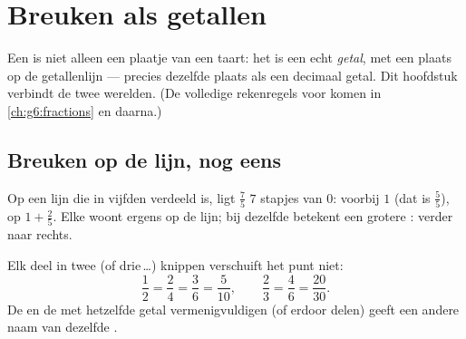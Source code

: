 \chapter{Breuken als getallen}\label{ch:g5:fractions}

Een  is niet alleen een plaatje van een taart: het is een echt
\emph{getal}, met een plaats op de getallenlijn ---  precies dezelfde
plaats als een decimaal getal. Dit hoofdstuk verbindt de twee werelden. (De
volledige rekenregels voor  komen in \cref{ch:g6:fractions} en
daarna.)

\section{Breuken op de lijn, nog eens}

\begin{example}\label{ex:g5:fractions:place}
Op een lijn die in vijfden verdeeld is, ligt $\frac{7}{5}$ $7$ stapjes van
$0$: voorbij $1$ (dat is $\frac55$), op $1 + \frac25$. Elke  woont
ergens op de lijn; bij dezelfde  betekent een grotere : verder
naar rechts.
\end{example}

\begin{proposition}\label{prop:g5:fractions:equal}
Elk deel in twee (of drie\,\dots) knippen verschuift het punt niet:
\[
\frac{1}{2} = \frac{2}{4} = \frac{3}{6} = \frac{5}{10},
\qquad
\frac{2}{3} = \frac{4}{6} = \frac{20}{30}.
\]
De  en de  met hetzelfde getal vermenigvuldigen (of erdoor
delen) geeft een andere naam van dezelfde .
\end{proposition}
\admitted

